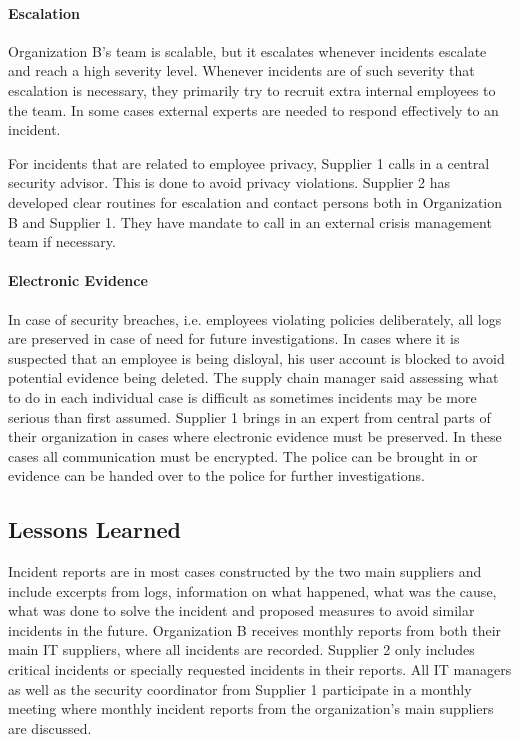 \paragraph{Escalation}
Organization B's team is scalable, but it escalates whenever incidents escalate and reach a high severity level. Whenever incidents are of such severity that escalation is necessary, they primarily try to recruit extra internal employees to the team. In some cases external experts are needed to respond effectively to an incident.

For incidents that are related to employee privacy, Supplier 1 calls in a central security advisor. This is done to avoid privacy violations. Supplier 2 has developed clear routines for escalation and contact persons both in Organization B and Supplier 1. They have mandate to call in an external crisis management team if necessary. 

\paragraph{Electronic Evidence}
In case of security breaches, i.e. employees violating policies deliberately, all logs are preserved in case of need for future investigations. In cases where it is suspected that an employee is being disloyal, his user account is blocked to avoid potential evidence being deleted. The supply chain manager said assessing what to do in each individual case is difficult as sometimes incidents may be more serious than first assumed. Supplier 1 brings in an expert from central parts of their organization in cases where electronic evidence must be preserved. In these cases all communication must be encrypted. The police can be brought in or evidence can be handed over to the police for further investigations.

\subsection{Lessons Learned}
Incident reports are in most cases constructed by the two main suppliers and include excerpts from logs, information on what happened, what was the cause, what was done to solve the incident and proposed measures to avoid similar incidents in the future. Organization B receives monthly reports from both their main IT suppliers, where all incidents are recorded. Supplier 2 only includes critical incidents or specially requested incidents in their reports. All IT managers as well as the security coordinator from Supplier 1 participate in a monthly meeting where monthly incident reports from the organization's main suppliers are discussed. 

